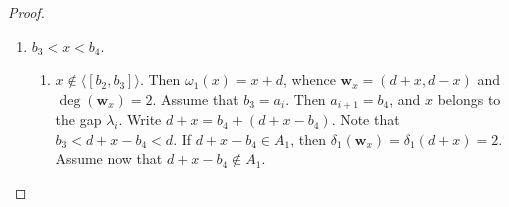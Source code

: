 \documentclass[10pt,a4paper]{amsart}
\def\deg{\operatorname{deg}}
\def\wbf{{\mathbf w}}
\begin{document}
\begin{proof}
\begin{enumerate}
\begin{enumerate}[\((\text{a}1)\)]
 From (\ref{EBd21}) and (\ref{EBd22}) we get
  \begin{equation}\label{EBd23} 
  D(x)  \leq \left\lceil \frac{a_{i+1} - x}{\epsilon'} \right\rceil +  \left\lfloor \frac{x-b_4 - a_i}{\epsilon'} \right\rfloor \leq \left\lceil \frac{\lambda_i -3 }{\epsilon'} \right\rceil  \leq 1 + \left\lfloor \frac{\lambda_i  -4}{\epsilon'} \right\rfloor \leq M+1.
   \end{equation}
      \item $a_j < x-b_4 < a_{j+1}$ for some $j<i$, that is $x$ and $x-b_4$ belong to two different gaps of $A_1$. Using $x= b_4 + x-b_4 = (b_4 + b^{''}_2) + a_j +  \left\lfloor \frac{x-b_4 - a_j}{b_2} \right\rfloor b_2$, where $0\leq b^{''}_2 < b_2$, we get
  \begin{equation}\label{EBd24}
  \delta_1(\wbf_x) = \delta_1(x) \leq 2 + \left\lfloor \frac{x-b_4 - a_j}{b_2} \right\rfloor \leq 2 + \left\lfloor \frac{a_{j+1} - 1 - a_j}{b_2} \right\rfloor \leq 2+ \left\lfloor \frac{\lambda_j}{b_2} \right\rfloor.
   \end{equation}
   From (\ref{EBd21}) we also have $\delta_2(\wbf_x) \leq 1 + \left\lceil \frac{ \lambda_i}{d-b_{2r}} \right\rceil$. Hence,
    \begin{equation}\label{EBd25}
  D(x)  \leq \left\lceil \frac{ \lambda_i}{d-b_{2r}} \right\rceil + \left\lfloor \frac{\lambda_j}{b_2} \right\rfloor \leq 1+  \left\lfloor \frac{ \lambda_i}{d-b_{2r}} \right\rfloor + \left\lfloor \frac{\lambda_j}{b_2} \right\rfloor.
     \end{equation}
   Note that if $\lambda_k\ge \lambda_l$ are two different gaps, then $\lambda_k \leq \lambda_{\max}$ and $\lambda_l \leq \lambda_{\mathrm{sl}}$. This implies
   $\left\lfloor \frac{ \lambda_i}{d-b_{2r}} \right\rfloor + \left\lfloor \frac{\lambda_j}{b_2} \right\rfloor \leq  M.$ Using this remark, from (\ref{EBd23}) and (\ref{EBd25}) we get in Case $a$ that $ D(x) \leq  M +1$.
  \end{enumerate}
     \item $ b_3 < x< b_4$.
     \begin{enumerate}[\((\text{b}1)\)]
         \item $x\not\in \langle [b_2,b_3]\rangle$. Then $\omega_1(x) = x+d$, whence $\wbf_x = (d+x, d-x)$ and $\deg(\wbf_x) = 2$. Assume that $b_3 = a_i$. Then $a_{i+1} = b_4$, and $x$ belongs to the gap $\lambda_i$. Write $d+x = b_4 + (d+x-b_4)$. Note that $b_3 <  d+x - b_4 < d$. If $d+x-b_4 \in A_1$, then $ \delta_1(\wbf_x) = \delta_1(d+ x)  =2$. Assume now that $d+x-b_4\not\in A_1$.
  

\end{enumerate}
\end{enumerate}
\end{proof}
\end{document}
